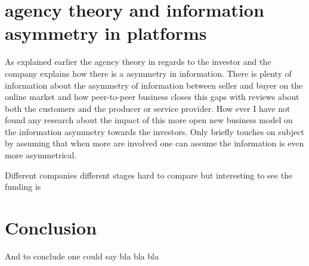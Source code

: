 \documentclass[a4paper, 11pt]{article}
\begin{document}
\section{agency theory and information asymmetry in platforms}
As explained earlier the agency theory in regards to the investor and the company explains how there is a asymmetry in information. There is plenty of information about the asymmetry of information between seller and buyer on the online market and how peer-to-peer business closes this gaps with reviews about both the customers and the producer or service provider. How ever I have not found any research about the impact of this more open new business model on the information asymmetry towards the investors. Only  \cite{colombo2016open} briefly touches on subject by assuming that when more are involved one can assume the information is even more asymmetrical.




Different companies different stages hard to compare but interesting to see the funding is




\section{Conclusion}

And to conclude one could say bla bla bla


\renewcommand{\textbf}{}
\renewcommand{\bf}{}
{}
\end{document}
